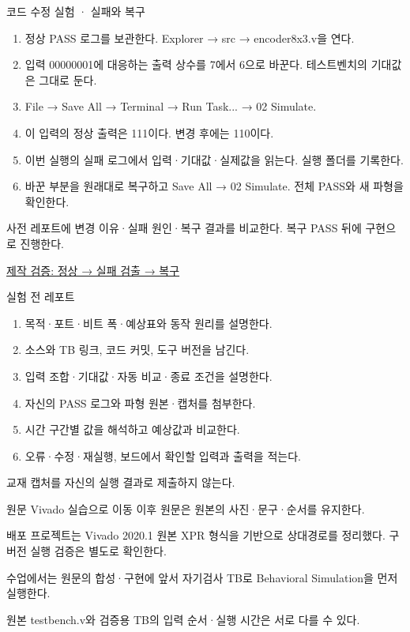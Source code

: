 \begin{frame}{코드 수정 실험 · 실패와 복구}\relax
\small
\begin{enumerate}\setlength{\itemsep}{0.22cm}
\item 정상 PASS 로그를 보관한다. Explorer → src → encoder8x3.v을 연다.
\item 입력 00000001에 대응하는 출력 상수를 7에서 6으로 바꾼다. 테스트벤치의 기대값은 그대로 둔다.
\item File → Save All → Terminal → Run Task... → 02 Simulate.
\item 이 입력의 정상 출력은 111이다. 변경 후에는 110이다.
\item 이번 실행의 실패 로그에서 입력·기대값·실제값을 읽는다. 실행 폴더를 기록한다.
\item 바꾼 부분을 원래대로 복구하고 Save All → 02 Simulate. 전체 PASS와 새 파형을 확인한다.
\end{enumerate}
사전 레포트에 변경 이유·실패 원인·복구 결과를 비교한다. 복구 PASS 뒤에 구현으로 진행한다.\par\href{https://github.com/Glaysia/ece2_26_2_2/blob/daily/0910/example/fpga_projects_hdl/LAB1/docs/student-modification-validation.json}{제작 검증: 정상 → 실패 검출 → 복구}
\end{frame}

\begin{frame}{실험 전 레포트}\relax
\small
\begin{enumerate}\setlength{\itemsep}{0.22cm}
\item 목적·포트·비트 폭·예상표와 동작 원리를 설명한다.
\item 소스와 TB 링크, 코드 커밋, 도구 버전을 남긴다.
\item 입력 조합·기대값·자동 비교·종료 조건을 설명한다.
\item 자신의 PASS 로그와 파형 원본·캡처를 첨부한다.
\item 시간 구간별 값을 해석하고 예상값과 비교한다.
\item 오류·수정·재실행, 보드에서 확인할 입력과 출력을 적는다.
\end{enumerate}
교재 캡처를 자신의 실행 결과로 제출하지 않는다.\par
\end{frame}

\begin{frame}[label=legacy-08-vivado]{원문 Vivado 실습으로 이동}\relax
\small
이후 원문은 원본의 사진·문구·순서를 유지한다.\par\vspace{0.22cm}배포 프로젝트는 Vivado 2020.1 원본 XPR 형식을 기반으로 상대경로를 정리했다. 구버전 실행 검증은 별도로 확인한다.\par\vspace{0.22cm}수업에서는 원문의 합성·구현에 앞서 자기검사 TB로 Behavioral Simulation을 먼저 실행한다.\par\vspace{0.22cm}원본 testbench.v와 검증용 TB의 입력 순서·실행 시간은 서로 다를 수 있다.\par
\end{frame}

